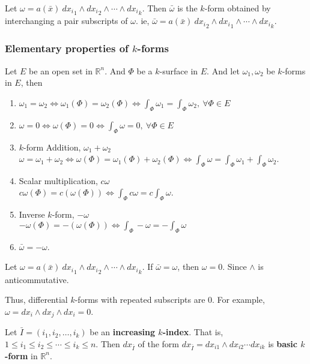 \begin{definition}
	Let $\omega = a(\bar{x})\ {dx_i}_1 \wedge {dx_i}_2 \wedge \dotsm \wedge {dx_i}_k$.
	Then \textbf{$\bar{\omega}$} is the $k$-form obtained by interchanging a pair subscripts of $\omega$.
	ie, $\bar{\omega} = a(\bar{x})\ {dx_i}_2 \wedge {dx_i}_1 \wedge \dotsm \wedge {dx_i}_k$. 
\end{definition}

\subsubsection{Elementary properties of $k$-forms}
\begin{definition}
	Let $E$ be an open set in $\mathbb{R}^n$.
	And $\Phi$ be a $k$-surface in $E$.
	And let $\omega_1,\omega_2$ be $k$-forms in $E$, then
	\begin{enumerate}
		\item $\omega_1 = \omega_2 \iff \omega_1(\Phi) = \omega_2(\Phi) \iff \int_\Phi \omega_1 = \int_\Phi \omega_2,\ \forall \Phi \in E$
		\item $\omega = 0 \iff \omega(\Phi) = 0 \iff \int_\Phi \omega = 0,\ \forall \Phi \in E$
		\item $k$-form Addition, $\omega_1+\omega_2$ \\
			$\omega = \omega_1 + \omega_2 \iff \omega(\Phi) = \omega_1(\Phi) + \omega_2(\Phi) \iff \int_\Phi \omega = \int_\Phi \omega_1 + \int_\Phi \omega_2$.
		\item Scalar multiplication, $c\omega$ \\
			$c\omega(\Phi) = c(\omega(\Phi)) \iff \int_\Phi c\omega = c\int_\Phi \omega$.
		\item Inverse $k$-form, $-\omega$ \\
			$-\omega(\Phi) = -(\omega(\Phi)) \iff \int_\Phi -\omega = -\int_\Phi \omega$
		\item $\bar{\omega} = -\omega$.
	\end{enumerate}
\end{definition}

\begin{remark}
	Let $\omega = a(\bar{x})\ {dx_i}_1 \wedge {dx_i}_2 \wedge \dotsm \wedge {dx_i}_k$. If $\bar{\omega} = \omega$, then $\omega = 0$. Since $\wedge$ is anticommutative.

	Thus, differential $k$-forms with repeated subscripts are $0$.
	For example, $\omega = dx_i \wedge dx_j \wedge dx_i = 0$.
\end{remark}

\begin{definition}
	Let $\bar{I} = (i_1,i_2,\dots,i_k)$ be an \textbf{increasing $k$-index}.
	That is, $1 \le i_1 \le i_2 \le \dotsb \le i_k \le n$.
	Then $dx_{\bar{I}}$ of the form $dx_{\bar{I}} = dx_{i1} \wedge dx_{i2} \dotsm dx_{ik}$ is \textbf{basic $k$-form} in $\mathbb{R}^n$.
\end{definition}


